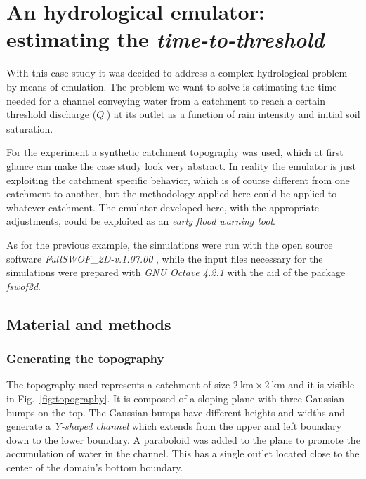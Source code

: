 {
\section{An hydrological emulator: estimating the \textit{time-to-threshold}}

With this case study it was decided to address a complex hydrological problem by means of emulation.
The problem we want to solve is estimating the time needed for a channel conveying water from a catchment to reach a certain threshold discharge ($Q_!$) at its outlet as a function of rain intensity and initial soil saturation.

For the experiment a synthetic catchment topography was used, which at first glance can make the case study look very abstract.
In reality the emulator is just exploiting the catchment specific behavior, which is of course different from one catchment to another, but the methodology applied here could be applied to whatever catchment.
The emulator developed here, with the appropriate adjustments, could be exploited as an \emph{early flood warning tool}.

As for the previous example, the simulations were run with the open source software \textit{FullSWOF\_2D-v.1.07.00} \autocite{delestre_fullswof:_2014} , while the input files necessary for the simulations were prepared with \textit{GNU Octave 4.2.1} \autocite{octave_community_gnu_2018}  with the aid of the package \textit{fswof2d}.


\subsection{Material and methods}

\subsubsection{Generating the topography}

The topography used represents a catchment of size $\SI{2}{\kilo\meter} \times \SI{2}{\kilo\meter}$ and it is visible in Fig.~\ref{fig:topography}.
It is composed of a sloping plane with three Gaussian bumps on the top.
The Gaussian bumps have different heights and widths and generate a \emph{Y-shaped channel} which extends from the upper and left boundary down to the lower boundary.
A paraboloid was added to the plane to promote the accumulation of water in the channel.
This has a single outlet located close to the center of the domain's bottom boundary.

}
